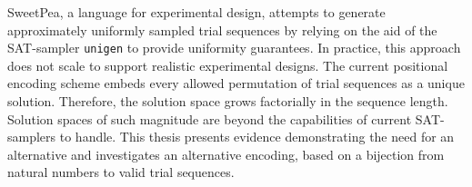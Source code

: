 
SweetPea, a language for experimental design, attempts to generate approximately uniformly sampled trial sequences by relying on the aid of the SAT-sampler \texttt{unigen} to provide uniformity guarantees. In practice, this approach does not scale to support realistic experimental designs. The current positional encoding scheme embeds every allowed permutation of trial sequences as a unique solution. Therefore, the solution space grows factorially in the sequence length. Solution spaces of such magnitude are beyond the capabilities of current SAT-samplers to handle. This thesis presents evidence demonstrating the need for an alternative and investigates an alternative encoding, based on a bijection from natural numbers to valid trial sequences.